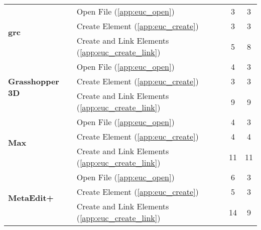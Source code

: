 \begin{table*}[!htb]
\begin{tabularx}{\textwidth}{lXcc}
\midrule
\multirow{3}{*}{\textbf{\ac{grc}}}
& Open File (\ref{app:euc_open})                       & 3 & 3 \\
& Create Element (\ref{app:euc_create})                & 3 & 3 \\
& Create and Link Elements (\ref{app:euc_create_link}) & 5 & 8 \\
\midrule
\multirow{3}{*}{\textbf{Grasshopper 3D}}
& Open File (\ref{app:euc_open})                       & 4 & 3 \\
& Create Element (\ref{app:euc_create})                & 3 & 3 \\
& Create and Link Elements (\ref{app:euc_create_link}) & 9 & 9 \\
\midrule
\multirow{3}{*}{\textbf{Max}}
& Open File (\ref{app:euc_open})                       & 4  & 3 \\
& Create Element (\ref{app:euc_create})                & 4  & 4 \\
& Create and Link Elements (\ref{app:euc_create_link}) & 11 & 11 \\
\midrule
\multirow{3}{*}{\textbf{MetaEdit+}}
& Open File (\ref{app:euc_open})                       & 6 & 3 \\
& Create Element (\ref{app:euc_create})                & 5 & 3 \\
& Create and Link Elements (\ref{app:euc_create_link}) & 14 & 9 \\
\bottomrule
\end{tabularx}
\end{table*}

